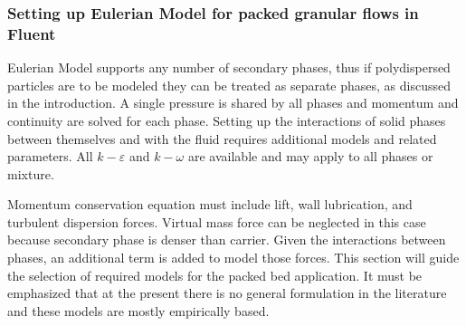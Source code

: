 \subsubsection{Setting up Eulerian Model for packed granular flows in Fluent}

Eulerian Model supports any number of secondary phases, thus if polydispersed particles are to be modeled they can be treated as separate phases, as discussed in the introduction. A single pressure is shared by all phases and momentum and continuity are solved for each phase. Setting up the interactions of solid phases between themselves and with the fluid requires additional models and related parameters. All $k-\varepsilon$ and $k-\omega$ are available and may apply to all phases or mixture.

Momentum conservation equation must include lift, wall lubrication, and turbulent dispersion forces. Virtual mass force can be neglected in this case because secondary phase is denser than carrier. Given the interactions between phases, an additional term is added to model those forces. This section will guide the selection of required models for the packed bed application. It must be emphasized that at the present there is no general formulation in the literature and these models are mostly empirically based.

 
\endinput